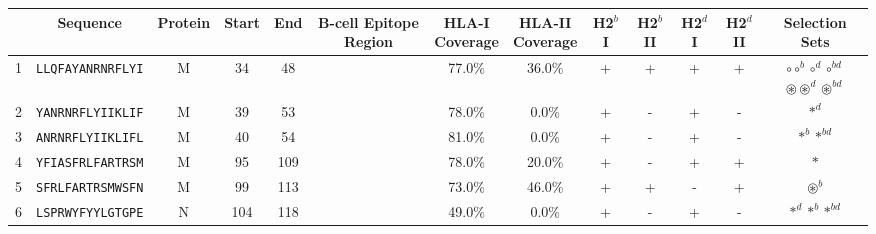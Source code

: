 \begin{tabular}{rcccccccccccc}
\toprule
{} &                  Sequence & Protein &  Start &   End &                                            B-cell Epitope Region & \Centerstack{HLA-I \\ Coverage} & \Centerstack{HLA-II \\ Coverage} & H2$^{b}$ I & H2$^{b}$ II & H2$^{d}$ I & H2$^{d}$ II &                                                                                        Selection Sets \\
\midrule
1  &  \texttt{LLQFAYANRNRFLYI} &       M &     34 &    48 &                                                                  &                          77.0\% &                           36.0\% &          + &           + &          + &           + &  \Centerstack{  $\circ \circ^b \circ^d \circ^{bd}$ \\  $\circledast \circledast^d \circledast^{bd}$ } \\
2  &  \texttt{YANRNRFLYIIKLIF} &       M &     39 &    53 &                                                                  &                          78.0\% &                            0.0\% &          + &           - &          + &           - &                                                                                            $ \ast^d $ \\
3  &  \texttt{ANRNRFLYIIKLIFL} &       M &     40 &    54 &                                                                  &                          81.0\% &                            0.0\% &          + &           - &          + &           - &                                                                                  $ \ast^b \ast^{bd} $ \\
4  &  \texttt{YFIASFRLFARTRSM} &       M &     95 &   109 &                                                                  &                          78.0\% &                           20.0\% &          + &           - &          + &           + &                                                                                              $ \ast $ \\
5  &  \texttt{SFRLFARTRSMWSFN} &       M &     99 &   113 &                                                                  &                          73.0\% &                           46.0\% &          + &           + &          - &           + &                                                                                     $ \circledast^b $ \\
6  &  \texttt{LSPRWYFYYLGTGPE} &       N &    104 &   118 &                                                                  &                          49.0\% &                            0.0\% &          + &           - &          + &           - &                                                                           $ \ast^d \ast^b \ast^{bd} $ \\

\end{tabular}
